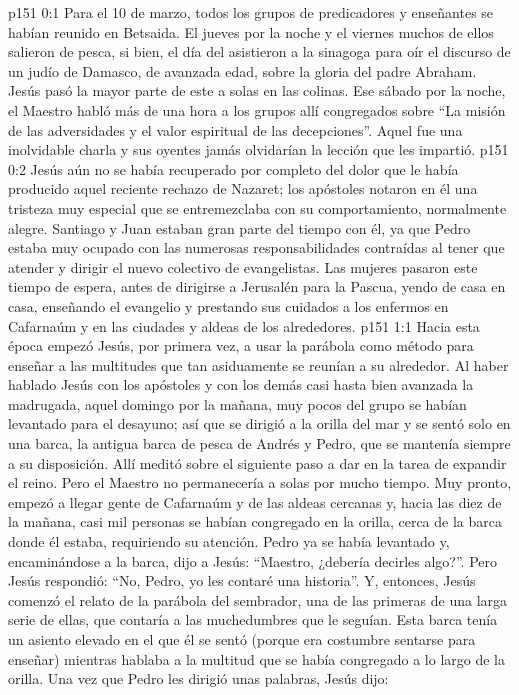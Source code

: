 \author{Comisión de seres intermedios}
\vs p151 0:1 Para el 10 de marzo, todos los grupos de predicadores y enseñantes se habían reunido en Betsaida. El jueves por la noche y el viernes muchos de ellos salieron de pesca, si bien, el día del  asistieron a la sinagoga para oír el discurso de un judío de Damasco, de avanzada edad, sobre la gloria del padre Abraham. Jesús pasó la mayor parte de este  a solas en las colinas. Ese sábado por la noche, el Maestro habló más de una hora a los grupos allí congregados sobre “La misión de las adversidades y el valor espiritual de las decepciones”. Aquel fue una inolvidable charla y sus oyentes jamás olvidarían la lección que les impartió.
\vs p151 0:2 Jesús aún no se había recuperado por completo del dolor que le había producido aquel reciente rechazo de Nazaret; los apóstoles notaron en él una tristeza muy especial que se entremezclaba con su comportamiento, normalmente alegre. Santiago y Juan estaban gran parte del tiempo con él, ya que Pedro estaba muy ocupado con las numerosas responsabilidades contraídas al tener que atender y dirigir el nuevo colectivo de evangelistas. Las mujeres pasaron este tiempo de espera, antes de dirigirse a Jerusalén para la Pascua, yendo de casa en casa, enseñando el evangelio y prestando sus cuidados a los enfermos en Cafarnaúm y en las ciudades y aldeas de los alrededores.
\vs p151 1:1 Hacia esta época empezó Jesús, por primera vez, a usar la parábola como método para enseñar a las multitudes que tan asiduamente se reunían a su alrededor. Al haber hablado Jesús con los apóstoles y con los demás casi hasta bien avanzada la madrugada, aquel domingo por la mañana, muy pocos del grupo se habían levantado para el desayuno; así que se dirigió a la orilla del mar y se sentó solo en una barca, la antigua barca de pesca de Andrés y Pedro, que se mantenía siempre a su disposición. Allí meditó sobre el siguiente paso a dar en la tarea de expandir el reino. Pero el Maestro no permanecería a solas por mucho tiempo. Muy pronto, empezó a llegar gente de Cafarnaúm y de las aldeas cercanas y, hacia las diez de la mañana, casi mil personas se habían congregado en la orilla, cerca de la barca donde él estaba, requiriendo su atención. Pedro ya se había levantado y, encaminándose a la barca, dijo a Jesús: “Maestro, ¿debería decirles algo?”. Pero Jesús respondió: “No, Pedro, yo les contaré una historia”. Y, entonces, Jesús comenzó el relato de la parábola del sembrador, una de las primeras de una larga serie de ellas, que contaría a las muchedumbres que le seguían. Esta barca tenía un asiento elevado en el que él se sentó (porque era costumbre sentarse para enseñar) mientras hablaba a la multitud que se había congregado a lo largo de la orilla. Una vez que Pedro les dirigió unas palabras, Jesús dijo:

